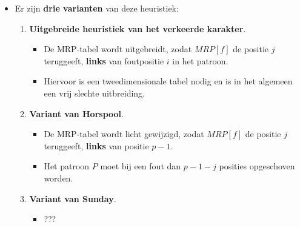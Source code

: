 \begin{itemize}
\begin{itemize}
        \item Het volstaat nu om de waarde $j = MRP[f]$ op te zoeken, waarbij $f$ het foute karakter in $P$ op positie $i$ is, en $P$ te verschuiven over $i - j$ posities. 
        \begin{itemize}
            \alert In het geval dat $i - j < 0$, dan bedraagt de verschuiving $1$ positie.
        \end{itemize}
    \end{itemize}
    \item Er zijn \textbf{drie varianten} van deze heuristiek:
    \begin{enumerate}
        \item \textbf{Uitgebreide heuristiek van het verkeerde karakter}.
        \begin{itemize}
            \item De MRP-tabel wordt uitgebreidt, zodat $MRP[f]$ de positie $j$ teruggeeft, \textbf{links} van foutpositie $i$ in het patroon.
            \item Hiervoor is een tweedimensionale tabel nodig en is in het algemeen een vrij slechte uitbreiding.

        \end{itemize}
        \item \textbf{Variant van Horspool}.
        \begin{itemize}
            \item De MRP-tabel wordt licht gewijzigd, zodat $MRP[f]$ de positie $j$ teruggeeft, \textbf{links} van positie $p - 1$.
            \item Het patroon $P$ moet bij een fout dan $p - 1 - j$ posities opgeschoven worden.
        \end{itemize}
        \item \textbf{Variant van Sunday}.
        \begin{itemize}
            \item ???
        \end{itemize}
    \end{enumerate}
    
\end{itemize}

